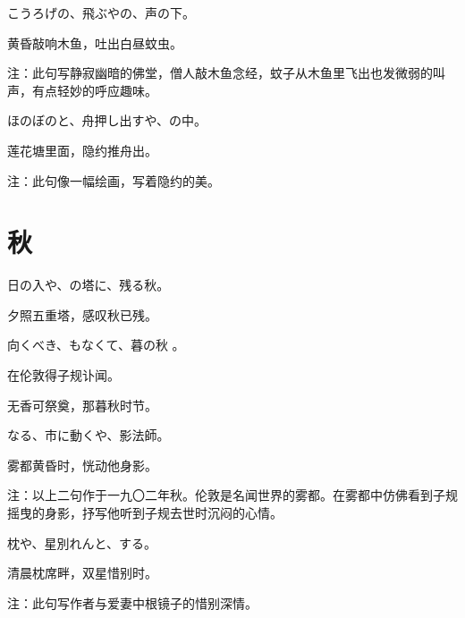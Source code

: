 \begin{haiku}
    {\FH こうろげの、飛ぶやの、声の下。}

    {\FK 黄昏敲响木鱼，吐出白昼蚊虫。}

    {\FT 注：此句写静寂幽暗的佛堂，僧人敲木鱼念经，蚊子从木鱼里飞出也发微弱的叫声，有点轻妙的呼应趣味。}
\end{haiku}

\begin{haiku}
    {\FH ほのぼのと、舟押し出すや、の中。}

    {\FK 莲花塘里面，隐约推舟出。}

    {\FT 注：此句像一幅绘画，写着隐约的美。}
\end{haiku}

\section{\FK 秋}

\setcounter{haikucounter}{0}

\begin{haiku}
    {\FH 日の入や、の塔に、残る秋。}

    {\FK 夕照五重塔，感叹秋已残。}
\end{haiku}

\begin{haiku}
    {\FH {}向くべき、もなくて、暮の秋
        。}

    {\FK 在伦敦得子规讣闻。}

    {\FK 无香可祭奠，那暮秋时节。}
\end{haiku}

\begin{haiku}
    {\FH {}なる、市に動くや、影法師。}

    {\FK 雾都黄昏时，恍动他身影。}

    {\FT 注：以上二句作于一九〇二年秋。伦敦是名闻世界的雾都。在雾都中仿佛看到子规摇曳的身影，抒写他听到子规去世时沉闷的心情。}
\end{haiku}

\begin{haiku}
    {\FH 枕や、星別れんと、する。}

    {\FK 清晨枕席畔，双星惜别时。}

    {\FT 注：此句写作者与爱妻中根镜子的惜别深情。}
\end{haiku}


